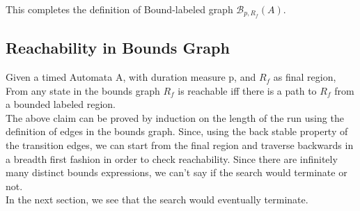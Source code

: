 \documentclass[a4paper,UKenglish,cleveref, autoref, thm-restate]{lipics-v2019}
\begin{document}
This completes the definition of Bound-labeled graph $\mathcal{B}_{p,R_f}(A)$.

\subsection{Reachability in Bounds Graph}
Given a timed Automata A, with duration measure p, and $R_f$ as final region, From any state in the bounds graph $R_f$ is reachable iff there is a path to $R_f$ from a bounded labeled region.\\
The above claim can be proved by induction on the length of the run using the definition of edges in the bounds graph. Since, using the back stable property of the transition edges, we can start from the final region and traverse backwards in a breadth first fashion in order to check reachability. Since there are infinitely many distinct bounds expressions, we can't say if the search would terminate or not.\\
In the next section, we see that the search would eventually terminate.
\end{document}

